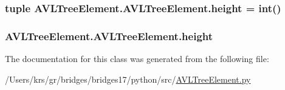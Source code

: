 \subsubsection[{height}]{\setlength{\rightskip}{0pt plus 5cm}tuple A\+V\+L\+Tree\+Element.\+A\+V\+L\+Tree\+Element.\+height = int()\hspace{0.3cm}{\ttfamily [static]}}\label{class_a_v_l_tree_element_1_1_a_v_l_tree_element_a6af5676b71ccb44e0f7e1b5a26cd9afc}
\hypertarget{class_a_v_l_tree_element_1_1_a_v_l_tree_element_acf75c045d479489e7a3add1b547d2624}{}
\subsubsection[{height}]{\setlength{\rightskip}{0pt plus 5cm}A\+V\+L\+Tree\+Element.\+A\+V\+L\+Tree\+Element.\+height}\label{class_a_v_l_tree_element_1_1_a_v_l_tree_element_acf75c045d479489e7a3add1b547d2624}


The documentation for this class was generated from the following file\+:\begin{DoxyCompactItemize}
\item 
/\+Users/krs/gr/bridges/bridges17/python/src/\hyperlink{_a_v_l_tree_element_8py}{A\+V\+L\+Tree\+Element.\+py}\end{DoxyCompactItemize}
